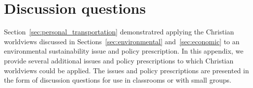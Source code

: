 \documentclass[12pt]{article}
\begin{document}
\appendix

\section{Discussion questions}
\label{sec:discussion_questions}

Section~\ref{sec:personal_transportation} demonstratred applying 
the Christian worldviews discussed in Sections~\ref{sec:environmental} and~\ref{sec:economic}
to an environmental sustainability issue and policy prescription.
In this appendix, we provide several additional issues and policy prescriptions 
to which Christian worldviews could be applied.
The issues and policy prescriptions are presented in the form of discussion questions
for use in classrooms or with small groups.
%
\end{document}
